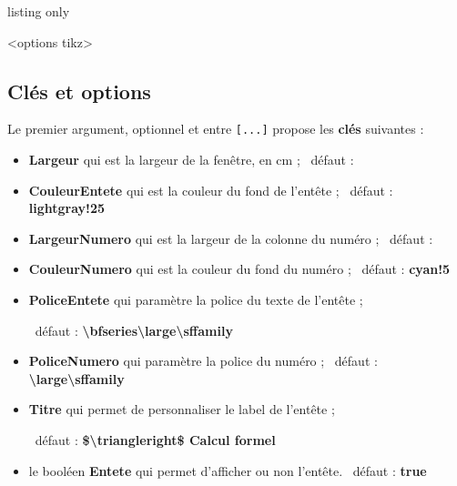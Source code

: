 \documentclass[french,a4paper,11pt]{article}
\newcommand\Cle[1]{{\bfseries\sffamily\textlangle #1\textrangle}}
\begin{document}
\begin{PresentationCode}{listing only}
\begin{CalculFormelGeogebra}<options tikz>
\end{CalculFormelGeogebra}
\end{PresentationCode}

\begin{PresentationCode}{}
\begin{CalculFormelGeogebra}
\end{CalculFormelGeogebra}
\end{PresentationCode}

\subsection{Clés et options}

\begin{tipblock}
Le premier argument, optionnel et entre \texttt{[...]} propose les \Cle{clés} suivantes :

\begin{itemize}
	\item \Cle{Largeur} qui est la largeur de la fenêtre, en cm ; \hfill~défaut : \Cle{10}
	\item \Cle{CouleurEntete} qui est la couleur du fond de l'entête ; \hfill~défaut : \Cle{lightgray!25}
	\item \Cle{LargeurNumero} qui est la largeur de la colonne du numéro ; \hfill~défaut : \Cle{1}
	\item \Cle{CouleurNumero} qui est la couleur du fond du numéro ; \hfill~défaut : \Cle{cyan!5}
	\item \Cle{PoliceEntete} qui paramètre la police du texte de l'entête  ;
	
	\hfill~défaut : \Cle{\textbackslash bfseries\textbackslash large\textbackslash sffamily}
	\item \Cle{PoliceNumero} qui paramètre la police du numéro  ; \hfill~défaut : \Cle{\textbackslash large\textbackslash sffamily}
	\item \Cle{Titre} qui permet de personnaliser le label de l'entête ;
	
	\hfill~défaut : \Cle{\$\textbackslash triangleright\$ Calcul formel}
	\item le booléen \Cle{Entete} qui permet d'afficher ou non l'entête. \hfill~défaut : \Cle{true}
\end{itemize}
\vspace*{-\baselineskip}\leavevmode
\end{tipblock}
\end{document}
